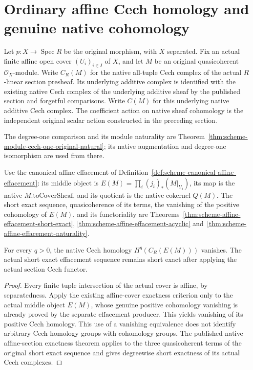 \section{Ordinary affine Cech homology and genuine native cohomology}

Let $p:X\to\operatorname{Spec}R$ be the original morphism, with $X$
separated. Fix an actual finite affine open cover $(U_i)_{i\in I}$ of
$X$, and let $M$ be an original quasicoherent $\mathcal O_X$-module.
Write $C_R(M)$ for the native all-tuple Cech complex of the actual
$R$-linear section presheaf. Its underlying additive complex is
identified with the existing native Cech complex of the underlying
additive sheaf by the published section and forgetful comparisons.
Write $C(M)$ for this underlying native additive Cech complex.
The coefficient action on native sheaf cohomology is the independent
original scalar action constructed in the preceding section.

The degree-one comparison and its module naturality are
Theorem~\ref{thm:scheme-module-cech-one-original-natural}; its native
augmentation and degree-one isomorphism are used from there.

Use the canonical affine effacement of
Definition~\ref{def:scheme-canonical-affine-effacement}: its middle object is
$E(M)=\prod_i(j_i)_*(M|_{U_i})$, its map is the native
$M.\mathrm{toCoverSheaf}$, and its quotient is the native
cokernel $Q(M)$. The short exact sequence, quasicoherence of
its terms, the vanishing of the positive cohomology of $E(M)$, and
its functoriality are
Theorems~\ref{thm:scheme-affine-effacement-short-exact}, \ref{thm:scheme-affine-effacement-acyclic}
and~\ref{thm:scheme-affine-effacement-naturality}.

\begin{lemma}
\label{lem:scheme-module-cech-native-effacement-cech}
\leanok
{}
For every $q>0$, the native Cech homology
$H^q(C_R(E(M)))$ vanishes. The actual short exact effacement sequence
remains short exact after applying the actual section Cech functor.
\end{lemma}
\begin{proof}
Every finite tuple intersection of the actual cover is affine, by
separatedness. Apply the existing affine-cover exactness criterion
only to the actual middle object $E(M)$, whose genuine positive
cohomology vanishing is already proved by the separate effacement
producer. This yields vanishing of its positive Cech homology. This
use of a vanishing equivalence does not identify arbitrary Cech
homology groups with cohomology groups. The published native
affine-section exactness theorem applies to the three quasicoherent
terms of the original short exact sequence and gives degreewise short
exactness of its actual Cech complexes.
\end{proof}

